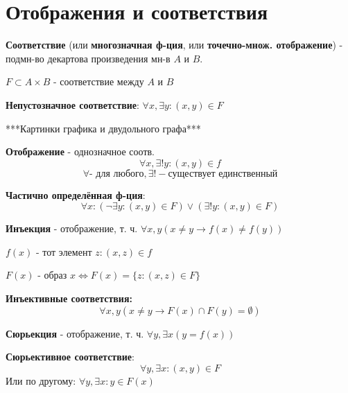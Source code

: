 \section{Отображения и соответствия}
\begin{definition}
\textbf{Соответствие} (или \textbf{многозначная ф-ция}, или \textbf{точечно-множ. отображение}) - подмн-во декартова произведения мн-в $A$ и $B$.

$F \subset A \times B$ - соответствие между $A$ и $B$
\end{definition}
\begin{note}
\textbf{Непустозначное соответствие}: $\forall x, \exists y \colon  (x, y) \in F$
\end{note}

***Картинки графика и двудольного графа***

\begin{definition}
\textbf{Отображение} - однозначное соотв.
\[
\forall x, \exists! y\colon (x, y) \in f
\] 
\[
\forall \text{- для любого}, \exists! - \text{существует единственный}
\] 
\end{definition}
\begin{definition}
\textbf{Частично определённая ф-ция}:
\[
  \forall x \colon (\neg \exists y \colon (x, y) \in F) \lor (\exists ! y \colon  (x, y) \in F)
\]
\end{definition}
\begin{definition}
\textbf{Инъекция} - отображение, т. ч. $\forall x, y (x \neq y \rightarrow f(x) \neq f(y))$
\end{definition}
\begin{definition}
    \textbf{$f(x)$} - тот элемент $z \colon (x, z) \in f$
\end{definition}
\begin{definition}
    $F(x)$ - образ $x \iff F(x) = \{z \colon (x, z) \in F\}$
\end{definition}
\begin{definition}
    \textbf{Инъективные соответствия:}
    \[
    \forall x, y (x \neq y \rightarrow F(x) \cap F(y) = \emptyset)
    \] 
\end{definition}
\begin{definition}
    \textbf{Сюрьекция} - отображение, т. ч. $\forall y, \exists x (y = f(x))$
\end{definition}
\begin{definition}
    \textbf{Сюрьективное соответствие}:
    \[
    \forall y, \exists x \colon  (x, y) \in F
    \] 
    Или по другому: $\forall y, \exists x \colon y \in F(x) $
\end{definition}
